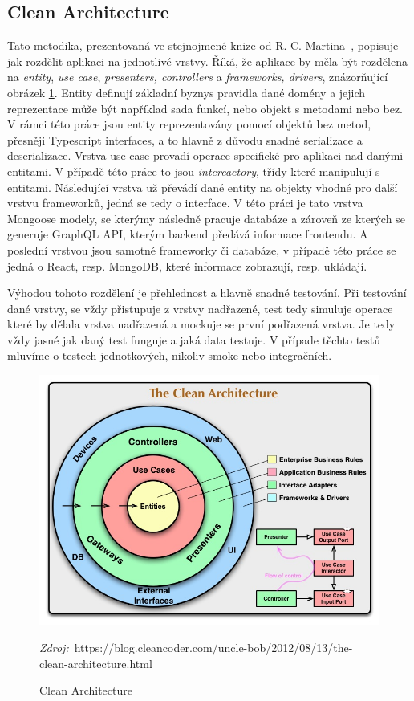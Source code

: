 \subsection{Clean Architecture}
\label{ss:clean_architecture}
Tato metodika, prezentovaná ve stejnojmené knize od R. C. Martina~\cite{martin_2018_clean}, popisuje jak rozdělit aplikaci na jednotlivé vrstvy. Říká, že aplikace by měla být rozdělena na \emph{entity}, \emph{use case}, \emph{presenters, controllers} a \emph{frameworks, drivers}, znázorňující obrázek \ref{fig:clean_architecture}.
Entity definují základní byznys pravidla dané domény a jejich reprezentace může být například sada funkcí, nebo objekt s metodami nebo bez. V rámci této práce jsou entity reprezentovány pomocí objektů bez metod, přesněji Typescript interfaces, a to hlavně z důvodu snadné serializace a deserializace.
Vrstva use case provadí operace specifické pro aplikaci nad danými entitami. V případě této práce to jsou \emph{intereactory}, třídy které manipulují s entitami.
Následující vrstva už převádí dané entity na objekty vhodné pro další vrstvu frameworků, jedná se tedy o interface. V této práci je tato vrstva Mongoose modely, se kterýmy následně pracuje databáze a zároveň ze kterých se generuje GraphQL API, kterým backend předává informace frontendu. A poslední vrstvou jsou samotné frameworky či databáze, v případě této práce se jedná o React, resp. MongoDB, které informace zobrazují, resp. ukládají.

Výhodou tohoto rozdělení je přehlednost a hlavně snadné testování. Při testování dané vrstvy, se vždy přistupuje z vrstvy nadřazené, test tedy simuluje operace které by dělala vrstva nadřazená a mockuje se první podřazená vrstva. Je tedy vždy jasné jak daný test funguje a jaká data testuje. V případe těchto testů mluvíme o testech jednotkových, nikoliv smoke nebo integračních.

\begin{figure}
    \centering
    \includegraphics[width=\textwidth]{assets/clean_architecture.jpg}
    \caption{Clean Architecture}
    \label{fig:clean_architecture}
    \textit{Zdroj:}~https://blog.cleancoder.com/uncle-bob/2012/08/13/the-clean-architecture.html
\end{figure}
